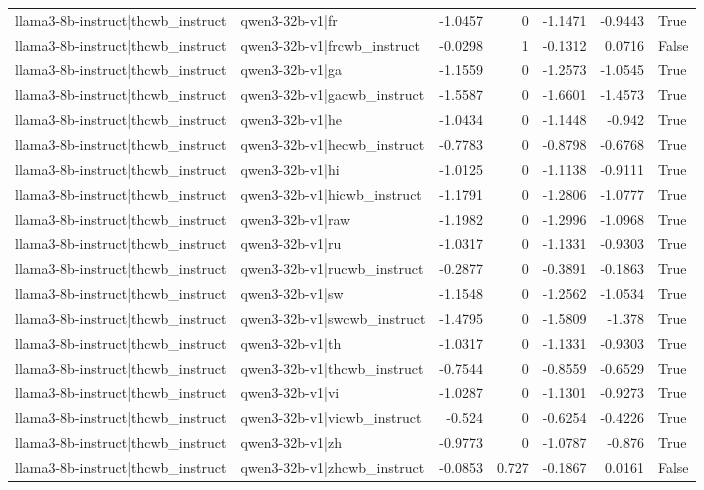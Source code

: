 \begin{table}
\begin{tabular}{l l r r r r l}
llama3-8b-instruct|thcwb_instruct & qwen3-32b-v1|fr & -1.0457 & 0 & -1.1471 & -0.9443 & True \\
llama3-8b-instruct|thcwb_instruct & qwen3-32b-v1|frcwb_instruct & -0.0298 & 1 & -0.1312 & 0.0716 & False \\
llama3-8b-instruct|thcwb_instruct & qwen3-32b-v1|ga & -1.1559 & 0 & -1.2573 & -1.0545 & True \\
llama3-8b-instruct|thcwb_instruct & qwen3-32b-v1|gacwb_instruct & -1.5587 & 0 & -1.6601 & -1.4573 & True \\
llama3-8b-instruct|thcwb_instruct & qwen3-32b-v1|he & -1.0434 & 0 & -1.1448 & -0.942 & True \\
llama3-8b-instruct|thcwb_instruct & qwen3-32b-v1|hecwb_instruct & -0.7783 & 0 & -0.8798 & -0.6768 & True \\
llama3-8b-instruct|thcwb_instruct & qwen3-32b-v1|hi & -1.0125 & 0 & -1.1138 & -0.9111 & True \\
llama3-8b-instruct|thcwb_instruct & qwen3-32b-v1|hicwb_instruct & -1.1791 & 0 & -1.2806 & -1.0777 & True \\
llama3-8b-instruct|thcwb_instruct & qwen3-32b-v1|raw & -1.1982 & 0 & -1.2996 & -1.0968 & True \\
llama3-8b-instruct|thcwb_instruct & qwen3-32b-v1|ru & -1.0317 & 0 & -1.1331 & -0.9303 & True \\
llama3-8b-instruct|thcwb_instruct & qwen3-32b-v1|rucwb_instruct & -0.2877 & 0 & -0.3891 & -0.1863 & True \\
llama3-8b-instruct|thcwb_instruct & qwen3-32b-v1|sw & -1.1548 & 0 & -1.2562 & -1.0534 & True \\
llama3-8b-instruct|thcwb_instruct & qwen3-32b-v1|swcwb_instruct & -1.4795 & 0 & -1.5809 & -1.378 & True \\
llama3-8b-instruct|thcwb_instruct & qwen3-32b-v1|th & -1.0317 & 0 & -1.1331 & -0.9303 & True \\
llama3-8b-instruct|thcwb_instruct & qwen3-32b-v1|thcwb_instruct & -0.7544 & 0 & -0.8559 & -0.6529 & True \\
llama3-8b-instruct|thcwb_instruct & qwen3-32b-v1|vi & -1.0287 & 0 & -1.1301 & -0.9273 & True \\
llama3-8b-instruct|thcwb_instruct & qwen3-32b-v1|vicwb_instruct & -0.524 & 0 & -0.6254 & -0.4226 & True \\
llama3-8b-instruct|thcwb_instruct & qwen3-32b-v1|zh & -0.9773 & 0 & -1.0787 & -0.876 & True \\
llama3-8b-instruct|thcwb_instruct & qwen3-32b-v1|zhcwb_instruct & -0.0853 & 0.727 & -0.1867 & 0.0161 & False \\

\end{tabular}
\end{table}
